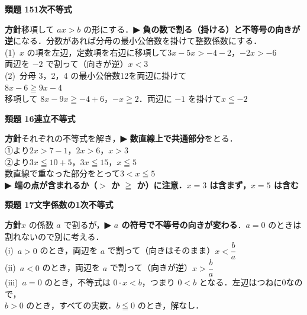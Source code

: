 \documentclass[a4paper,11pt]{ltjsarticle}
\newcommand{\ans}[2]{\Needspace{5\baselineskip}\vspace{6pt}%
  {\sffamily\bfseries 類題 #1\quad #2}\par}
\newcommand{\point}[1]{\textsf{\bfseries ▶ #1}}
\begin{document}
\ans{15}{1次不等式}
\begin{kai}
\textbf{方針}\quad 移項して $ax>b$ の形にする．\point{負の数で割る（掛ける）と不等号の向きが逆}になる．分数があれば分母の最小公倍数を掛けて整数係数にする．\\[2pt]
(1)\ $x$ の項を左辺，定数項を右辺に移項して\quad $3x-5x>-4-2$，\quad $-2x>-6$\\
\hspace*{1.5em}両辺を $-2$ で割って（向きが逆）\quad $x<3$\\[2pt]
(2)\ 分母 3，2，4 の最小公倍数12を両辺に掛けて\\
\hspace*{1.5em}$8x-6\geqq9x-4$\\
\hspace*{1.5em}移項して $8x-9x\geqq-4+6$，\quad $-x\geqq2$．\quad 両辺に $-1$ を掛けて\quad $x\leqq-2$
\end{kai}

\ans{16}{連立不等式}
\begin{kai}
\textbf{方針}\quad それぞれの不等式を解き，\point{数直線上で共通部分}をとる．\\[2pt]
①より\quad $2x>7-1$，$2x>6$，\quad $x>3$\\
②より\quad $3x\leqq10+5$，$3x\leqq15$，\quad $x\leqq5$\\[2pt]
数直線で重なった部分をとって\quad $3<x\leqq5$\\
\point{端の点が含まれるか（$>$ か $\geqq$ か）に注意．$x=3$ は含まず，$x=5$ は含む}
\end{kai}

\ans{17}{文字係数の1次不等式}
\begin{kai}
\textbf{方針}\quad $x$ の係数 $a$ で割るが，\point{$a$ の符号で不等号の向きが変わる}．$a=0$ のときは割れないので別に考える．\\[2pt]
(i)\ $a>0$ のとき，両辺を $a$ で割って（向きはそのまま）\quad $x<\dfrac ba$\\[2pt]
(ii)\ $a<0$ のとき，両辺を $a$ で割って（向きが逆）\quad $x>\dfrac ba$\\[2pt]
(iii)\ $a=0$ のとき，不等式は $0\cdot x<b$，つまり $0<b$ となる．左辺はつねに0なので，\\
\hspace*{1.5em}$b>0$ のとき，すべての実数．\quad $b\leqq0$ のとき，解なし．
\end{kai}
\end{document}

